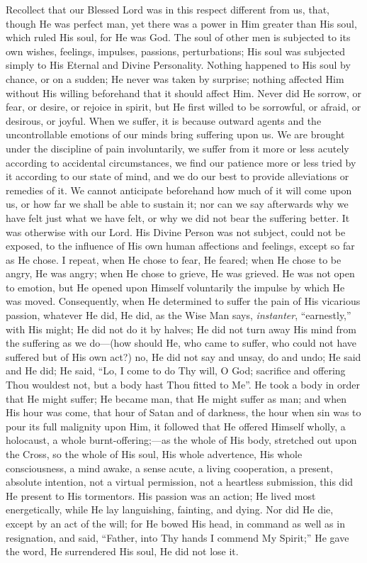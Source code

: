 Recollect that our Blessed Lord was in this respect different from
us, that, though He was perfect man, yet there was a power in Him
greater than His soul, which ruled His soul, for He was God. The soul
of other men is subjected to its own wishes, feelings, impulses,
passions, perturbations; His soul was subjected simply to His Eternal
and Divine Personality. Nothing happened to His soul by chance, or on
a sudden; He never was taken by surprise; nothing affected Him without
His willing beforehand that it should affect Him. Never did He sorrow,
or fear, or desire, or rejoice in spirit, but He first willed to be
sorrowful, or afraid, or desirous, or joyful. When we suffer, it is
because outward agents and the uncontrollable emotions of our minds
bring suffering upon us. We are brought under the discipline of pain
involuntarily, we suffer from it more or less acutely according to
accidental circumstances, we find our patience more or less tried by
it according to our state of mind, and we do our best to provide
alleviations or remedies of it. We cannot anticipate beforehand how
much of it will come upon us, or how far we shall be able to sustain
it; nor can we say afterwards why we have felt just what we have felt,
or why we did not bear the suffering better. It was otherwise with our
Lord. His Divine Person was not subject, could not be exposed, to the
influence of His own human affections and feelings, except so far as
He chose. I repeat, when He chose to fear, He feared; when He chose to
be angry, He was angry; when He chose to grieve, He was grieved. He
was not open to emotion, but He opened upon Himself voluntarily the
impulse by which He was moved. Consequently, when He determined to
suffer the pain of His vicarious passion, whatever He did, He did, as
the Wise Man says, \emph{instanter}, ``earnestly,'' with His might;
He did not do it by halves; He did not turn away His mind from the
suffering as we do—(how should He, who came to suffer, who could not
have suffered but of His own act?) no, He did not say and unsay, do
and undo; He said and He did; He said, ``Lo, I come to do Thy
will, O God; sacrifice and offering Thou wouldest not, but a body hast
Thou fitted to Me''. He took a body in order that He might suffer;
He became man, that He might suffer as man; and when His hour was
come, that hour of Satan and of darkness, the hour when sin was to
pour its full malignity upon Him, it followed that He offered Himself
wholly, a holocaust, a whole burnt-offering;—as the whole of His
body, stretched out upon the Cross, so the whole of His soul, His
whole advertence, His whole consciousness, a mind awake, a sense
acute, a living cooperation, a present, absolute intention, not a
virtual permission, not a heartless submission, this did He present to
His tormentors. His passion was an action; He lived most
energetically, while He lay languishing, fainting, and dying. Nor did
He die, except by an act of the will; for He bowed His head, in
command as well as in resignation, and said, ``Father, into Thy
hands I commend My Spirit;'' He gave the word, He surrendered His
soul, He did not lose it.

